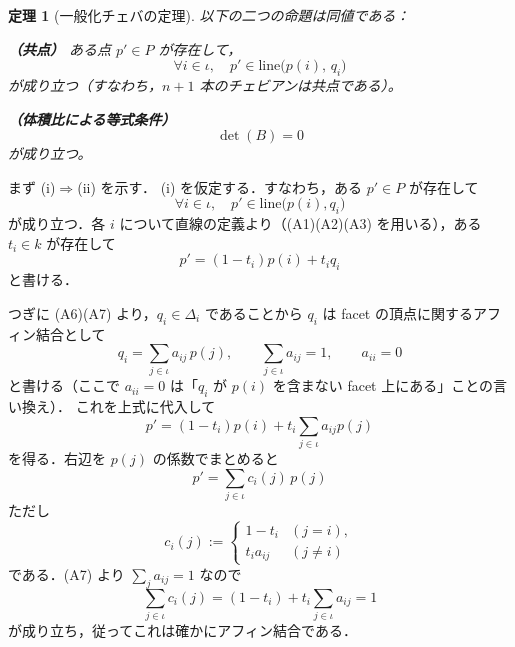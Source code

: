 \documentclass[a4paper,12pt]{bxjsbook}
\makeatletter
\newlength{\customindent}
\newenvironment{body}{
  \par
  \begingroup
  \setlength{\leftskip}{\customindent}
  \setlength{\rightskip}{0pt}
  \setlength{\parindent}{1em}
  \setlength{\displayindent}{\customindent}
  \setlength{\displaywidth}{\dimexpr\linewidth-\customindent\relax}
}{
  \par
  \endgroup
}
\theoremstyle{theorem}
\newtheorem{theorem}{定理}[chapter]
\renewenvironment{proof}[1][\proofname]{%
  \par\pushQED{\qed}%
  \normalfont
  \topsep6\p@\@plus6\p@\relax
  \list{}{%
    \leftmargin=\customindent
    \rightmargin=0pt
    \labelwidth=0pt
    \labelsep=0pt
    \itemindent=0pt
    \listparindent=0pt
    \parsep=0pt
  }%
  \item[\itshape #1\@addpunct{.}\hspace{0.5em}]%
  \setlength{\displayindent}{\customindent}%
  \setlength{\displaywidth}{\dimexpr\linewidth-\customindent\relax}%
  \ignorespaces
}{%
  \popQED\endlist\@endpefalse
}
\makeatother
\begin{document}
\begin{body}
\begin{theorem}[一般化チェバの定理]
        以下の二つの命題は同値である：
        \begin{theoremenumerate}[label=(\roman*), leftmargin=4em, topsep=2pt, partopsep=0pt, itemsep=0pt, parsep=0pt]
            \item \textbf{（共点）} ある点 $p'\in P$ が存在して，
            \[
            \forall i\in\iota,\quad p'\in \mathrm{line}\bigl(p(i),\,q_i\bigr)
            \]
            が成り立つ（すなわち，$n+1$ 本のチェビアンは共点である）。
            \item \textbf{（体積比による等式条件）}
            \[
            \det(B)=0
            \]
            が成り立つ。
        \end{theoremenumerate}
    \end{theorem}

    \begin{proof}
        まず (i)$\Rightarrow$(ii) を示す．
        (i) を仮定する．すなわち，ある $p'\in P$ が存在して
        \[
        \forall i\in\iota,\quad p' \in \mathrm{line}\bigl(p(i),q_i\bigr)
        \]
        が成り立つ．各 $i$ について直線の定義より（(A1)(A2)(A3) を用いる），ある $t_i\in k$ が存在して
        \[
        p'=(1-t_i)p(i)+t_i q_i
        \]
        と書ける．

        つぎに (A6)(A7) より，$q_i\in\Delta_i$ であることから $q_i$ は facet の頂点に関するアフィン結合として
        \[
        q_i=\sum_{j\in\iota} a_{ij}\,p(j),\qquad \sum_{j\in\iota}a_{ij}=1,\qquad a_{ii}=0
        \]
        と書ける（ここで $a_{ii}=0$ は「$q_i$ が $p(i)$ を含まない facet 上にある」ことの言い換え）．
        これを上式に代入して
        \[
        p'=(1-t_i)p(i)+t_i\sum_{j\in\iota}a_{ij}p(j)
        \]
        を得る．右辺を $p(j)$ の係数でまとめると
        \[
        p'=\sum_{j\in\iota} c_i(j)\,p(j)
        \]
        ただし
        \[
        c_i(j):=
        \begin{cases}
            1-t_i & (j=i),\\
            t_i a_{ij} & (j\neq i)
        \end{cases}
        \]
        である．(A7) より $\sum_j a_{ij}=1$ なので
        \[
        \sum_{j\in\iota}c_i(j)=(1-t_i)+t_i\sum_{j\in\iota}a_{ij}=1
        \]
        が成り立ち，従ってこれは確かにアフィン結合である．


\end{proof}
\end{body}
\end{document}
